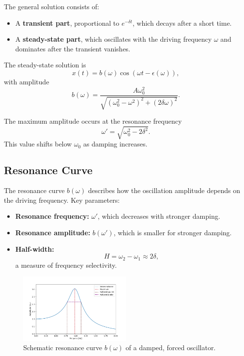 The general solution consists of:
\begin{itemize}
    \item A \textbf{transient part}, proportional to $e^{-\delta t}$, which decays after a short time.
    \item A \textbf{steady-state part}, which oscillates with the driving frequency $\omega$ and dominates after the transient vanishes.
\end{itemize}

The steady-state solution is
\begin{equation}
x(t) = b(\omega) \cos(\omega t - \epsilon(\omega)),
\end{equation}
with amplitude
\begin{equation}
b(\omega) = \frac{A \omega_0^2}{\sqrt{(\omega_0^2 - \omega^2)^2 + (2 \delta \omega)^2}}.
\end{equation}

The maximum amplitude occurs at the resonance frequency
\begin{equation}
\omega' = \sqrt{\omega_0^2 - 2 \delta^2}.
\end{equation}
This value shifts below $\omega_0$ as damping increases.

\subsection{Resonance Curve}
The resonance curve $b(\omega)$ describes how the oscillation amplitude depends on the driving frequency. Key parameters:
\begin{itemize}
    \item \textbf{Resonance frequency:} $\omega'$, which decreases with stronger damping.
    \item \textbf{Resonance amplitude:} $b(\omega')$, which is smaller for stronger damping.
    \item \textbf{Half-width:} 
    \begin{equation}
        H = \omega_2 - \omega_1 \approx 2\delta,
        \label{eq:h_delta}
    \end{equation}
    a measure of frequency selectivity.
\end{itemize}

\begin{figure}[h!] 
    \centering 
    \includegraphics[width=0.5\textwidth]{img/13/Resonanzkurve_allgemein.png} 
    \caption{ Schematic resonance curve $b(\omega)$ of a damped, forced oscillator.} 
    \label{fig:resonancecurve} 
\end{figure}


